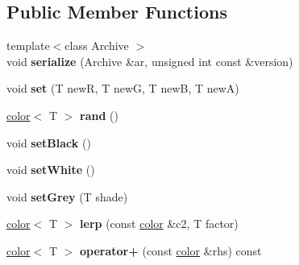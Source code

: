 \subsection*{\-Public \-Member \-Functions}
\begin{DoxyCompactItemize}
\item 
\hypertarget{classgru_1_1Color_1_1color_a9f0a874da6486a90fd73466ceb97cf06}{{\footnotesize template$<$class Archive $>$ }\\void {\bfseries serialize} (\-Archive \&ar, unsigned int const \&version)}\label{classgru_1_1Color_1_1color_a9f0a874da6486a90fd73466ceb97cf06}

\item 
\hypertarget{classgru_1_1Color_1_1color_ab4d907a0c777fcc41b4f9547b2b38981}{void {\bfseries set} (\-T new\-R, \-T new\-G, \-T new\-B, \-T new\-A)}\label{classgru_1_1Color_1_1color_ab4d907a0c777fcc41b4f9547b2b38981}

\item 
\hypertarget{classgru_1_1Color_1_1color_a271e9155e38ee2fc2711de1ab46e4f0f}{\hyperlink{classgru_1_1Color_1_1color}{color}$<$ \-T $>$ {\bfseries rand} ()}\label{classgru_1_1Color_1_1color_a271e9155e38ee2fc2711de1ab46e4f0f}

\item 
\hypertarget{classgru_1_1Color_1_1color_a9b4d3df04df489f0fdb9e63a1154e75e}{void {\bfseries set\-Black} ()}\label{classgru_1_1Color_1_1color_a9b4d3df04df489f0fdb9e63a1154e75e}

\item 
\hypertarget{classgru_1_1Color_1_1color_a2b5d0fbd3598432dd0eabe1c0510afd4}{void {\bfseries set\-White} ()}\label{classgru_1_1Color_1_1color_a2b5d0fbd3598432dd0eabe1c0510afd4}

\item 
\hypertarget{classgru_1_1Color_1_1color_a4c98a0eb32fc7bf785a39fbeb9ddecf3}{void {\bfseries set\-Grey} (\-T shade)}\label{classgru_1_1Color_1_1color_a4c98a0eb32fc7bf785a39fbeb9ddecf3}

\item 
\hypertarget{classgru_1_1Color_1_1color_abfa6629ca4a2cfef14b0de6a223c5703}{\hyperlink{classgru_1_1Color_1_1color}{color}$<$ \-T $>$ {\bfseries lerp} (const \hyperlink{classgru_1_1Color_1_1color}{color} \&c2, \-T factor)}\label{classgru_1_1Color_1_1color_abfa6629ca4a2cfef14b0de6a223c5703}

\item 
\hypertarget{classgru_1_1Color_1_1color_acd6cace466f8ddb27a9d22980ce4fa08}{\hyperlink{classgru_1_1Color_1_1color}{color}$<$ \-T $>$ {\bfseries operator+} (const \hyperlink{classgru_1_1Color_1_1color}{color} \&rhs) const }\label{classgru_1_1Color_1_1color_acd6cace466f8ddb27a9d22980ce4fa08}


\end{DoxyCompactItemize}

